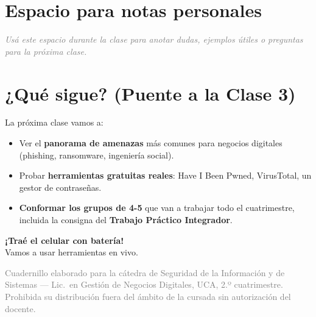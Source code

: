 \documentclass[12pt,a4paper]{article}
\begin{document}
\section{Espacio para notas personales}

\begin{tcolorbox}[colback=grisClaro, colframe=gray!50, arc=2mm, height=8cm]
\textcolor{gray}{\itshape Usá este espacio durante la clase para anotar dudas,
ejemplos útiles o preguntas para la próxima clase.}
\end{tcolorbox}

\section{¿Qué sigue? (Puente a la Clase 3)}

La próxima clase vamos a:
\begin{itemize}[leftmargin=2em]
  \item Ver el \textbf{panorama de amenazas} más comunes para negocios digitales
        (phishing, ransomware, ingeniería social).
  \item Probar \textbf{herramientas gratuitas reales}: Have I Been Pwned,
        VirusTotal, un gestor de contraseñas.
  \item \textbf{Conformar los grupos de 4-5} que van a trabajar todo el
        cuatrimestre, incluida la consigna del \textbf{Trabajo Práctico Integrador}.
\end{itemize}

\begin{center}
\begin{tcolorbox}[colback=rojoAlerta!8, colframe=rojoAlerta,
                  width=0.8\textwidth, halign=center, arc=3mm]
  \Large{}\; \textbf{¡Traé el celular con batería!}\\[4pt]
  \normalsize Vamos a usar herramientas en vivo.
\end{tcolorbox}
\end{center}

\vfill
\begin{center}
\small\textcolor{gray}{%
Cuadernillo elaborado para la cátedra de Seguridad de la Información y de
Sistemas --- Lic.\ en Gestión de Negocios Digitales, UCA, 2.º cuatrimestre.\\
Prohibida su distribución fuera del ámbito de la cursada sin autorización del docente.}
\end{center}
\end{document}
